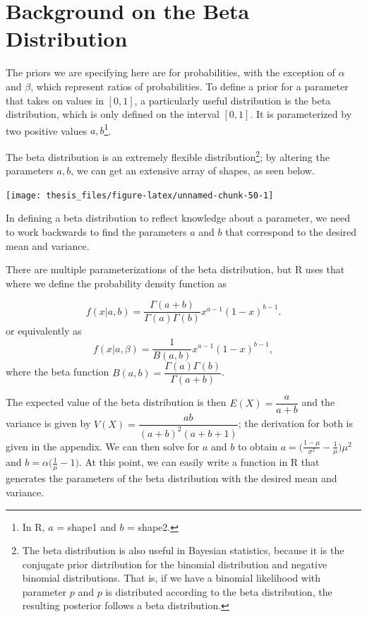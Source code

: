 \documentclass[12pt,twoside]{smiththesis}
\begin{document}
\hypertarget{background-on-the-beta-distribution}{%
\section{Background on the Beta Distribution}\label{background-on-the-beta-distribution}}

The priors we are specifying here are for probabilities, with the exception of \(\alpha\) and \(\beta\), which represent ratios of probabilities. To define a prior for a parameter that takes on values in \([0,1]\), a particularly useful distribution is the beta distribution, which is only defined on the interval \([0,1]\). It is parameterized by two positive values \(a, b\)\footnote{In R, \(a\) = shape1 and \(b\) = shape2.}.

The beta distribution is an extremely flexible distribution\footnote{The beta distribution is also useful in Bayesian statistics, because it is the conjugate prior distribution for the binomial distribution and negative binomial distributions. That is, if we have a binomial likelihood with parameter \(p\) and \(p\) is distributed according to the beta distribution, the resulting posterior follows a beta distribution.}; by altering the parameters \(a,b\), we can get an extensive array of shapes, as seen below.
\begin{center}\texttt{[image: thesis\_files/figure-latex/unnamed-chunk-50-1]} \end{center}

In defining a beta distribution to reflect knowledge about a parameter, we need to work backwards to find the parameters \(a\) and \(b\) that correspond to the desired mean and variance.

There are multiple parameterizations of the beta distribution, but R uses that where we define the probability density function as

\[
f(x|a,b) = \dfrac{\Gamma(a + b)}{\Gamma(a) \Gamma(b)} x^{a - 1} (1-x)^{b - 1}.
\]
or equivalently as
\[
f(x|a,\beta) = \dfrac{1}{B(a,b)} x^{a - 1} (1-x)^{b - 1},
\]
where the beta function \(B(a, b) = \dfrac{\Gamma(a)\Gamma(b) }{\Gamma ( a + b)}\).

The expected value of the beta distribution is then \(E(X) = \dfrac{a}{a + b}\) and the variance is given by \(V(X) = \dfrac{a b}{(a + b)^2(a +b + 1)}\); the derivation for both is given in the appendix. We can then solve for \(a\) and \(b\) to obtain \(a = \Big(\frac{1-\mu}{\sigma^2} - \frac{1}{\mu}\Big) \mu^2\) and \(b = \alpha\Big(\frac{1}{\mu} - 1\Big)\). At this point, we can easily write a function in R that generates the parameters of the beta distribution with the desired mean and variance.
\end{document}
